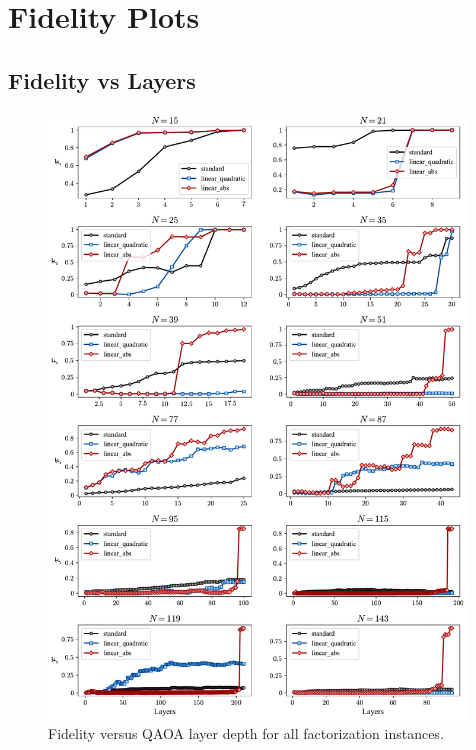 \newpage
\section{Fidelity Plots}
\label{Section:FidelityPlots}

\subsection*{Fidelity vs Layers}
\begin{figure}[H]
    \centering
    \includegraphics[width=0.99\textwidth]{06-appendix/figs/fidelity_layers_all.pdf}
    \caption{Fidelity versus QAOA layer depth for all factorization instances.}
    \label{fig:fidelity_layers_all}
\end{figure}

